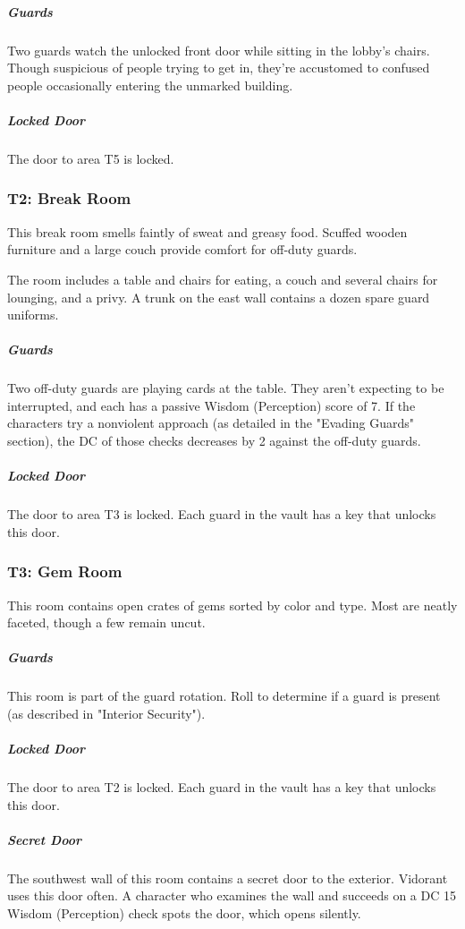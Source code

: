 \documentclass[10pt,a4paper,twoside,bg=print,twocolumn,openany,nodeprecatedcode]{dndbook}
\begin{document}
\subparagraph{Guards}
Two guards watch the unlocked front door while sitting in the lobby's chairs. Though suspicious of people trying to get in, they're accustomed to confused people occasionally entering the unmarked building.

\subparagraph{Locked Door}
The door to area T5 is locked.

\subsubsection{T2: Break Room}
\begin{DndReadAloud}{}
This break room smells faintly of sweat and greasy food. Scuffed wooden furniture and a large couch provide comfort for off-duty guards.

\end{DndReadAloud}

The room includes a table and chairs for eating, a couch and several chairs for lounging, and a privy. A trunk on the east wall contains a dozen spare guard uniforms.

\subparagraph{Guards}
Two off-duty guards are playing cards at the table. They aren't expecting to be interrupted, and each has a passive Wisdom (Perception) score of 7. If the characters try a nonviolent approach (as detailed in the "Evading Guards" section), the DC of those checks decreases by 2 against the off-duty guards.

\subparagraph{Locked Door}
The door to area T3 is locked. Each guard in the vault has a key that unlocks this door.

\subsubsection{T3: Gem Room}
\begin{DndReadAloud}{}
This room contains open crates of gems sorted by color and type. Most are neatly faceted, though a few remain uncut.

\end{DndReadAloud}

\subparagraph{Guards}
This room is part of the guard rotation. Roll to determine if a guard is present (as described in "Interior Security").

\subparagraph{Locked Door}
The door to area T2 is locked. Each guard in the vault has a key that unlocks this door.

\subparagraph{Secret Door}
The southwest wall of this room contains a secret door to the exterior. Vidorant uses this door often. A character who examines the wall and succeeds on a DC 15 Wisdom (Perception) check spots the door, which opens silently.
\end{document}
